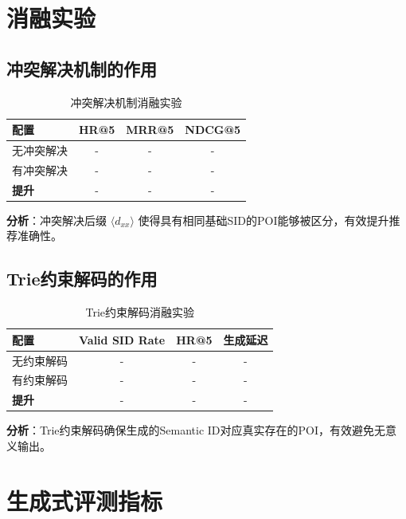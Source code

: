 \section{消融实验}
\label{sec:ablation}

\subsection{冲突解决机制的作用}
\label{sec:collision_ablation}

\begin{table}[htbp]
\centering
\caption{冲突解决机制消融实验}
\label{tab:collision_ablation}
\begin{tabular}{lccc}
\toprule
配置 & HR@5 & MRR@5 & NDCG@5 \\
\midrule
无冲突解决 & - & - & - \\
有冲突解决 & - & - & - \\
\midrule
\textbf{提升} & - & - & - \\
\bottomrule
\end{tabular}
\end{table}

\textbf{分析}：冲突解决后缀 $\langle d_{xx} \rangle$ 使得具有相同基础SID的POI能够被区分，有效提升推荐准确性。

\subsection{Trie约束解码的作用}
\label{sec:trie_ablation}

\begin{table}[htbp]
\centering
\caption{Trie约束解码消融实验}
\label{tab:trie_ablation}
\begin{tabular}{lccc}
\toprule
配置 & Valid SID Rate & HR@5 & 生成延迟 \\
\midrule
无约束解码 & - & - & - \\
有约束解码 & - & - & - \\
\midrule
\textbf{提升} & - & - & - \\
\bottomrule
\end{tabular}
\end{table}

\textbf{分析}：Trie约束解码确保生成的Semantic ID对应真实存在的POI，有效避免无意义输出。

\section{生成式评测指标}
\label{sec:generation_metrics}

